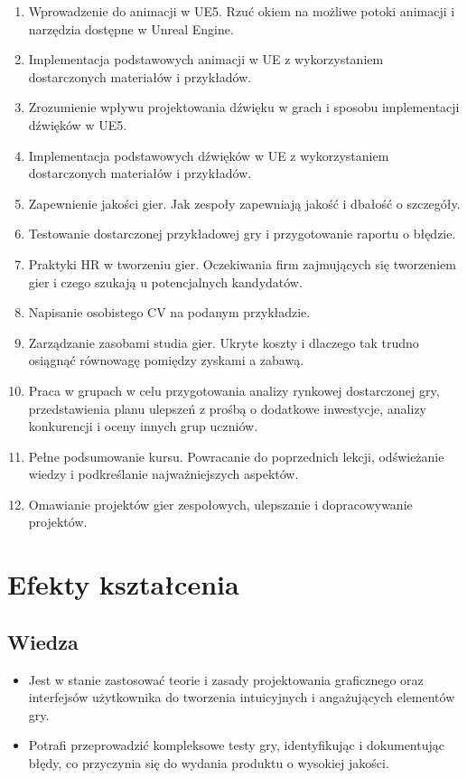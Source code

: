 \documentclass[12pt, a4paper]{article}
\begin{document}
\begin{enumerate}
  \item Wprowadzenie do animacji w UE5. Rzuć okiem na możliwe potoki animacji i narzędzia dostępne w Unreal Engine.
  \item Implementacja podstawowych animacji w UE z wykorzystaniem dostarczonych materiałów i przykładów.
  \item Zrozumienie wpływu projektowania dźwięku w grach i sposobu implementacji dźwięków w UE5.
  \item Implementacja podstawowych dźwięków w UE z wykorzystaniem dostarczonych materiałów i przykładów.
  \item Zapewnienie jakości gier. Jak zespoły zapewniają jakość i dbałość o szczegóły.
  \item Testowanie dostarczonej przykładowej gry i przygotowanie raportu o błędzie.
  \item Praktyki HR w tworzeniu gier. Oczekiwania firm zajmujących się tworzeniem gier i czego szukają u potencjalnych kandydatów.
  \item Napisanie osobistego CV na podanym przykładzie.
  \item Zarządzanie zasobami studia gier. Ukryte koszty i dlaczego tak trudno osiągnąć równowagę pomiędzy zyskami a zabawą.
  \item Praca w grupach w celu przygotowania analizy rynkowej dostarczonej gry, przedstawienia planu ulepszeń z prośbą o dodatkowe inwestycje, analizy konkurencji i oceny innych grup uczniów.
  \item Pełne podsumowanie kursu. Powracanie do poprzednich lekcji, odświeżanie wiedzy i podkreślanie najważniejszych aspektów.
  \item Omawianie projektów gier zespołowych, ulepszanie i dopracowywanie projektów.
\end{enumerate}

\section{Efekty kształcenia}

\subsection*{Wiedza}
\begin{itemize}
  \item Jest w stanie zastosować teorie i zasady projektowania graficznego oraz interfejsów użytkownika do tworzenia intuicyjnych i angażujących elementów gry.
  \item Potrafi przeprowadzić kompleksowe testy gry, identyfikując i dokumentując błędy, co przyczynia się do wydania produktu o wysokiej jakości.
\end{itemize}
\end{document}
